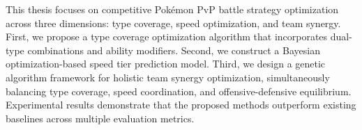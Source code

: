 This thesis focuses on competitive Pokémon PvP battle strategy optimization across three dimensions: type coverage, speed optimization, and team synergy. First, we propose a type coverage optimization algorithm that incorporates dual-type combinations and ability modifiers. Second, we construct a Bayesian optimization-based speed tier prediction model. Third, we design a genetic algorithm framework for holistic team synergy optimization, simultaneously balancing type coverage, speed coordination, and offensive-defensive equilibrium. Experimental results demonstrate that the proposed methods outperform existing baselines across multiple evaluation metrics.

